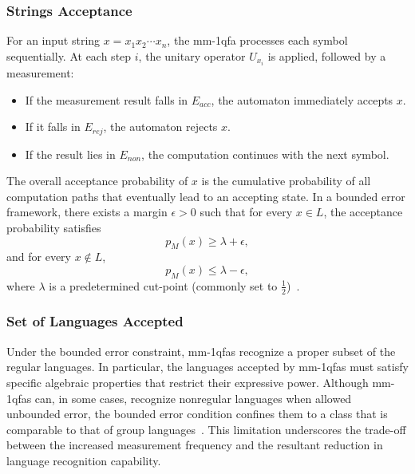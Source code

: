 \subsubsection{Strings Acceptance}
For an input string $x=x_1x_2\cdots x_n$, the \gls{mm-1qfa} processes each symbol sequentially. At each step $i$, the unitary operator $U_{x_i}$ is applied, followed by a measurement:
\begin{itemize}
    \item If the measurement result falls in $E_{acc}$, the automaton immediately accepts $x$.
    \item If it falls in $E_{rej}$, the automaton rejects $x$.
    \item If the result lies in $E_{non}$, the computation continues with the next symbol.
\end{itemize}
The overall acceptance probability of $x$ is the cumulative probability of all computation paths that eventually lead to an accepting state. In a bounded error framework, there exists a margin $\epsilon > 0$ such that for every $x\in L$, the acceptance probability satisfies
\[
p_M(x) \ge \lambda + \epsilon,
\]
and for every $x\notin L$, 
\[
p_M(x) \le \lambda - \epsilon,
\]
where $\lambda$ is a predetermined cut-point (commonly set to $\frac{1}{2}$)~\cite{646094,brodsky2002characterizations}.

\subsubsection{Set of Languages Accepted}
Under the bounded error constraint, \gls{mm-1qfa}s recognize a proper subset of the regular languages. In particular, the languages accepted by \gls{mm-1qfa}s must satisfy specific algebraic properties that restrict their expressive power. Although \gls{mm-1qfa}s can, in some cases, recognize nonregular languages when allowed unbounded error, the bounded error condition confines them to a class that is comparable to that of group languages~\cite{brodsky2002characterizations,646094}. This limitation underscores the trade-off between the increased measurement frequency and the resultant reduction in language recognition capability.

